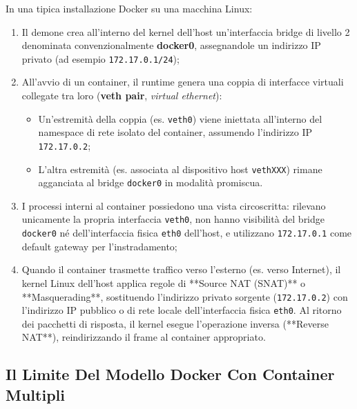 \documentclass[11pt, a4paper]{article}
\begin{document}
In una tipica installazione Docker su una macchina Linux:
\begin{enumerate}
    \item Il demone crea all'interno del kernel dell'host un'interfaccia bridge di livello 2 denominata convenzionalmente \textbf{docker0}, assegnandole un indirizzo IP privato (ad esempio \texttt{172.17.0.1/24});
    \item All'avvio di un container, il runtime genera una coppia di interfacce virtuali collegate tra loro (\textbf{veth pair}, \emph{virtual ethernet}):
    \begin{itemize}[noitemsep]
        \item Un'estremità della coppia (es. \texttt{veth0}) viene iniettata all'interno del namespace di rete isolato del container, assumendo l'indirizzo IP \texttt{172.17.0.2};
        \item L'altra estremità (es. associata al dispositivo host \texttt{vethXXX}) rimane agganciata al bridge \texttt{docker0} in modalità promiscua.
    \end{itemize}
    \item I processi interni al container possiedono una vista circoscritta: rilevano unicamente la propria interfaccia \texttt{veth0}, non hanno visibilità del bridge \texttt{docker0} né dell'interfaccia fisica \texttt{eth0} dell'host, e utilizzano \texttt{172.17.0.1} come default gateway per l'instradamento;
    \item Quando il container trasmette traffico verso l'esterno (es. verso Internet), il kernel Linux dell'host applica regole di **Source NAT (SNAT)** o **Masquerading**, sostituendo l'indirizzo privato sorgente (\texttt{172.17.0.2}) con l'indirizzo IP pubblico o di rete locale dell'interfaccia fisica \texttt{eth0}. Al ritorno dei pacchetti di risposta, il kernel esegue l'operazione inversa (**Reverse NAT**), reindirizzando il frame al container appropriato.
\end{enumerate}


\subsection{Il Limite Del Modello Docker Con Container Multipli}
\end{document}
